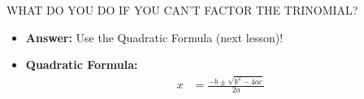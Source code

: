 \documentclass[aspectratio=169]{beamer}
\begin{document}
\begin{frame}{WHAT DO YOU DO IF YOU CAN'T FACTOR THE TRINOMIAL?}
    \begin{tcolorbox}[colback=lightgray,colframe=primary,title=Next Steps]
        \footnotesize
        \begin{itemize}
            \item \textbf{Answer:} Use the Quadratic Formula (next lesson)!
            \item \textbf{Quadratic Formula:}
            \begin{align*}
                x &= \frac{-b \pm \sqrt{b^2 - 4ac}}{2a}
            \end{align*}
        \end{itemize}
    \end{tcolorbox}
\end{frame}
\end{document}
